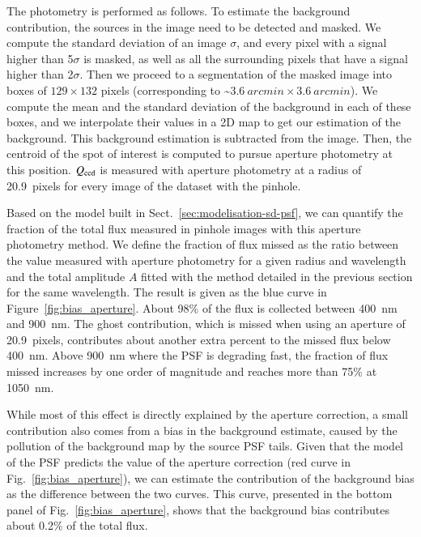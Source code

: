 The photometry is performed as follows. To estimate the background contribution, the sources in the image need to be detected and masked. We compute the standard deviation of an image $\sigma$, and every pixel with a signal higher than 5$\sigma$ is masked, as well as all the surrounding pixels that have a signal higher than 2$\sigma$. Then we proceed to a segmentation of the masked image into boxes of $129\times132$ pixels (corresponding to \textasciitilde $\SI{3.6}{arcmin} \times \SI{3.6}{arcmin}$). We compute the mean and the standard deviation of the background in each of these boxes, and we interpolate their values in a 2D map to get our estimation of the background. This background estimation is subtracted from the image. Then, the centroid of the spot of interest is computed to pursue aperture photometry at this position. $Q_{\mathrm{ccd}}$ is measured with aperture photometry at a radius of \SI{20.9}{pixels} for every image of the dataset with the \spinhole pinhole.

Based on the model built in Sect.~\ref{sec:modelisation-sd-psf}, we can quantify the fraction of the total flux measured in \spinhole pinhole images with this aperture photometry method. We define the fraction of flux missed as the ratio between the value measured with aperture photometry for a given radius and wavelength and the total amplitude $A$ fitted with the method detailed in the previous section for the same wavelength. The result is given as the blue curve in Figure~\ref{fig:bias_aperture}. About 98\% of the flux is collected between \SI{400}{\nano\meter} and \SI{900}{\nano\meter}. The ghost contribution, which is missed when using an aperture of \SI{20.9}{pixels}, contributes about another extra percent to the missed flux below \SI{400}{\nano\meter}. Above \SI{900}{\nano\meter} where the PSF is degrading fast, the fraction of flux missed increases by one order of magnitude and reaches more than 75\% at \SI{1050}{nm}.

While most of this effect is directly explained by the aperture correction, a small contribution also comes from a bias in the background estimate, caused by the pollution of the background map by the source PSF tails. Given that the model of the PSF predicts the value of the aperture correction (red curve in Fig.~\ref{fig:bias_aperture}), we can estimate the contribution of the background bias as the difference between the two curves. This curve, presented in the bottom panel of Fig.~\ref{fig:bias_aperture}, shows that the background bias contributes about 0.2\% of the total flux.

